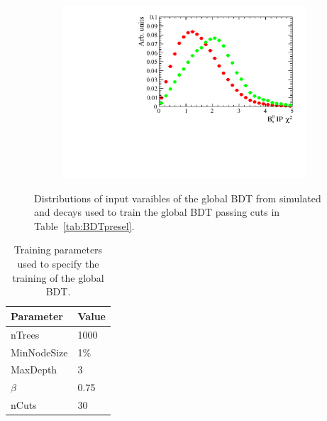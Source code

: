 \begin{figure}
    \begin{subfigure}[b]{0.4\textwidth}
        \includegraphics[width=\textwidth]{./Figs/Selection/var5_sim_all.pdf}
        \caption{ }
        \label{fig:}
    \end{subfigure}
    \caption{Distributions of input varaibles of the global BDT from simulated \bsmumu and \bbbarmumux decays used to train the global BDT passing cuts in Table~\ref{tab:BDTpresel}.}
    \label{fig:BDTvars}
\end{figure}


\begin{table}[htbp]
\begin{center}
\begin{tabular}{ll}
\hline
Parameter & Value \\ \hline
nTrees & 1000 \\
MinNodeSize & 1$\%$ \\
MaxDepth & 3 \\
$\beta$ & 0.75 \\
nCuts & 30 \\
\hline
\end{tabular}
\vspace{0.7cm}
\caption{Training parameters used to specify the training of the global BDT.}
\label{tab:BDTtrainingparams}
\end{center}
\end{table}



